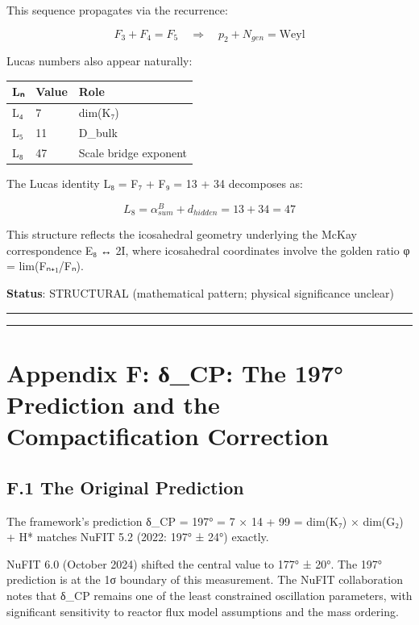 \documentclass[11pt,a4paper]{article}
\begin{document}
This sequence propagates via the recurrence:

\[F_3 + F_4 = F_5 \quad \Rightarrow \quad p_2 + N_{gen} = \text{Weyl}\]

Lucas numbers also appear naturally:

\begin{longtable}[]{@{}lll@{}}
\toprule\noalign{}
Lₙ & Value & Role \\
\midrule\noalign{}
\endhead
\bottomrule\noalign{}
\endlastfoot
L₄ & 7 & dim(K₇) \\
L₅ & 11 & D\_\allowbreak{}bulk \\
L₈ & 47 & Scale bridge exponent \\
\end{longtable}

The Lucas identity L₈ = F₇ + F₉ = 13 + 34 decomposes as:

\[L_8 = \alpha_{sum}^B + d_{hidden} = 13 + 34 = 47\]

This structure reflects the icosahedral geometry underlying the McKay correspondence E₈ ↔ 2I, where icosahedral coordinates involve the golden ratio φ = lim(Fₙ₊₁/Fₙ).

\textbf{Status}: STRUCTURAL (mathematical pattern; physical significance unclear)

\begin{center}\rule{\linewidth}{0.5pt}\end{center}

\begin{center}\rule{\linewidth}{0.5pt}\end{center}

\section{Appendix F: δ\_\allowbreak{}CP: The 197° Prediction and the Compactification Correction}\label{appendix-f-ux3b4_cp-the-197-prediction-and-the-compactification-correction}

\subsection{F.1 The Original Prediction}\label{f.1-the-original-prediction}

The framework's prediction δ\_\allowbreak{}CP = 197° = 7 × 14 + 99 = dim(K₇) × dim(G₂) + H* matches NuFIT 5.2 (2022: 197° ± 24°) exactly.

NuFIT 6.0 (October 2024) shifted the central value to 177° ± 20°. The 197° prediction is at the 1σ boundary of this measurement. The NuFIT collaboration notes that δ\_\allowbreak{}CP remains one of the least constrained oscillation parameters, with significant sensitivity to reactor flux model assumptions and the mass ordering.
\end{document}
